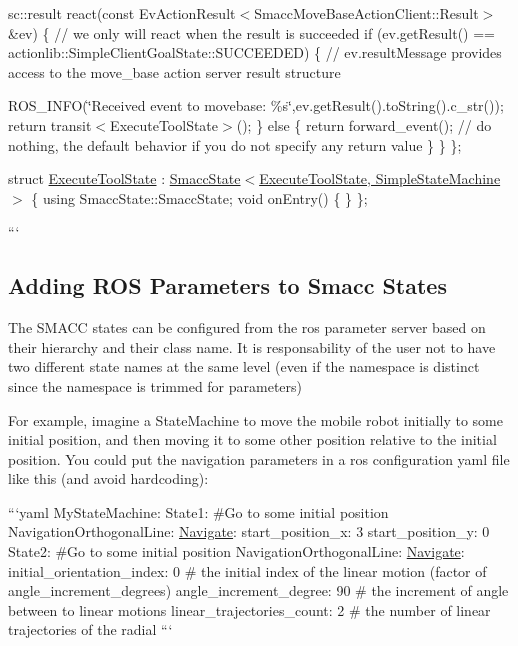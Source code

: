 sc\-::result react(const Ev\-Action\-Result$<$\-Smacc\-Move\-Base\-Action\-Client\-::\-Result$>$ \&ev) \{ // we only will react when the result is succeeded if (ev.\-get\-Result() == actionlib\-::\-Simple\-Client\-Goal\-State\-::\-S\-U\-C\-C\-E\-E\-D\-E\-D) \{ // ev.\-result\-Message provides access to the move\-\_\-base action server result structure

R\-O\-S\-\_\-\-I\-N\-F\-O(\char`\"{}\-Received event to movebase\-: \%s\char`\"{},ev.\-get\-Result().to\-String().c\-\_\-str()); return transit$<$\-Execute\-Tool\-State$>$(); \} else \{ return forward\-\_\-event(); // do nothing, the default behavior if you do not specify any return value \} \} \};

struct \hyperlink{structExecuteToolState}{Execute\-Tool\-State} \-: \hyperlink{classsmacc_1_1SmaccState}{Smacc\-State$<$\-Execute\-Tool\-State, Simple\-State\-Machine$>$} \{ using Smacc\-State\-::\-Smacc\-State; void on\-Entry() \{ \} \};

```

\subsection*{Adding R\-O\-S Parameters to Smacc States}

The S\-M\-A\-C\-C states can be configured from the ros parameter server based on their hierarchy and their class name. It is responsability of the user not to have two different state names at the same level (even if the namespace is distinct since the namespace is trimmed for parameters)

For example, imagine a State\-Machine to move the mobile robot initially to some initial position, and then moving it to some other position relative to the initial position. You could put the navigation parameters in a ros configuration yaml file like this (and avoid hardcoding)\-:

```yaml My\-State\-Machine\-: State1\-: \#\-Go to some initial position Navigation\-Orthogonal\-Line\-: \hyperlink{structNavigate}{Navigate}\-: start\-\_\-position\-\_\-x\-: 3 start\-\_\-position\-\_\-y\-: 0 State2\-: \#\-Go to some initial position Navigation\-Orthogonal\-Line\-: \hyperlink{structNavigate}{Navigate}\-: initial\-\_\-orientation\-\_\-index\-: 0 \# the initial index of the linear motion (factor of angle\-\_\-increment\-\_\-degrees) angle\-\_\-increment\-\_\-degree\-: 90 \# the increment of angle between to linear motions linear\-\_\-trajectories\-\_\-count\-: 2 \# the number of linear trajectories of the radial ```

